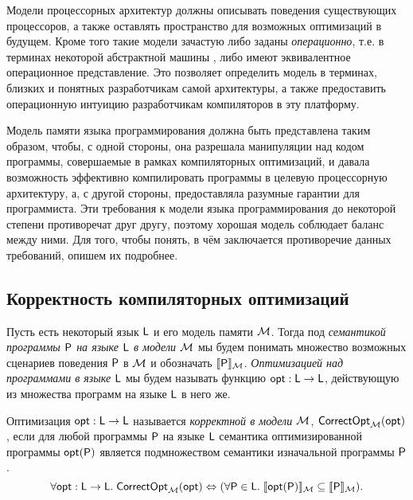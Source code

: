 Модели процессорных архитектур должны описывать поведения существующих процессоров, а также оставлять пространство
для возможных оптимизаций в будущем.
Кроме того такие модели зачастую либо заданы \emph{операционно}, т.е. в терминах некоторой
абстрактной машины \cite{Diehl-al:FGCS00}, либо имеют эквивалентное операционное представление.
Это позволяет определить модель в терминах, близких и понятных разработчикам самой архитектуры, а также предоставить
операционную интуицию разработчикам компиляторов в эту платформу.

Модель памяти языка программирования должна быть представлена таким образом, чтобы, с одной стороны,
она разрешала манипуляции над кодом программы, совершаемые в рамках компиляторных оптимизаций, и давала возможность
эффективно компилировать программы в целевую процессорную архитектуру, а, с другой стороны, предоставляла
разумные гарантии для программиста.
Эти требования к модели языка программирования до некоторой степени противоречат друг другу, поэтому хорошая модель
соблюдает баланс между ними.
Для того, чтобы понять, в чём заключается противоречие данных требований, опишем их подробнее.

\subsection{Корректность компиляторных оптимизаций}
Пусть есть некоторый язык $\mathsf{L}$ и его модель памяти $\mathcal{M}$. Тогда под \emph{семантикой программы $\mathsf{P}$ на языке $\mathsf{L}$ в модели $\mathcal{M}$}
мы будем понимать множество возможных сценариев поведения $\mathsf{P}$ в $\mathcal{M}$ и обозначать $\llbracket \mathsf{P} \rrbracket_{\mathcal{M}}$.
\emph{Оптимизацией над программами в языке $\mathsf{L}$} мы будем называть функцию $\mathsf{opt} : \mathsf{L} \rightarrow \mathsf{L}$, действующую из
множества программ на языке $\mathsf{L}$ в него же.
\begin{definition}
  Оптимизация $\mathsf{opt} : \mathsf{L} \rightarrow \mathsf{L}$ называется \emph{корректной в модели $\mathcal{M}$},
  $\mathsf{CorrectOpt}_{\mathcal{M}}(\mathsf{opt})$, если для любой программы $\mathsf{P}$ на языке $\mathsf{L}$
  семантика оптимизированной программы $\mathsf{opt}(\mathsf{P})$ является подмножеством семантики изначальной программы $\mathsf{P}$.
  \[\forall \mathsf{opt} : \mathsf{L} \rightarrow \mathsf{L}. \; \mathsf{CorrectOpt}_{\mathcal{M}}(\mathsf{opt}) \Leftrightarrow (\forall \mathsf{P} \in \mathsf{L}. \; \llbracket \mathsf{opt}(\mathsf{P}) \rrbracket_{\mathcal{M}} \subseteq \llbracket \mathsf{P} \rrbracket_{\mathcal{M}}). \]
\end{definition}

